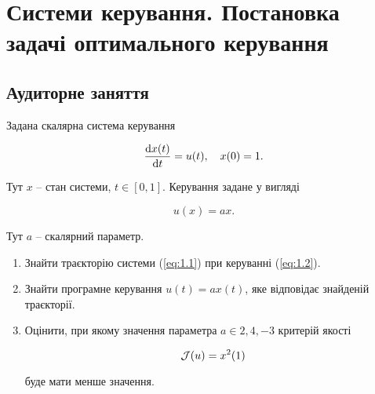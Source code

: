 \section{Системи керування. Постановка задачі оптимального керування}

\subsection*{Аудиторне заняття}

\begin{problem}
	Задана скалярна система керування 
	
	\begin{equation}
		\label{eq:1.1}
		\frac{\mathop{}\!\mathrm{d} x(t)}{\mathop{}\!\mathrm{d} t} = u(t), \quad x(0) = 1.
	\end{equation}

	Тут $x$ -- стан системи, $t \in [0, 1]$. Керування задане у вигляді

	\begin{equation}
		\label{eq:1.2}
		u(x) = a x.
	\end{equation}

	Тут $a$ -- скалярний параметр.

	\begin{enumerate}
		\item Знайти траєкторію системи (\ref{eq:1.1}) при керуванні (\ref{eq:1.2}).

		\item Знайти програмне керування $u(t) = a x (t)$, яке відповідає знайденій траєкторії. 

		\item Оцінити, при якому значення параметра $a \in {2, 4, -3}$ критерій якості 

		\[ \mathcal{J}(u) = x^2 (1) \]

		буде мати менше значення.
	\end{enumerate}
\end{problem}

